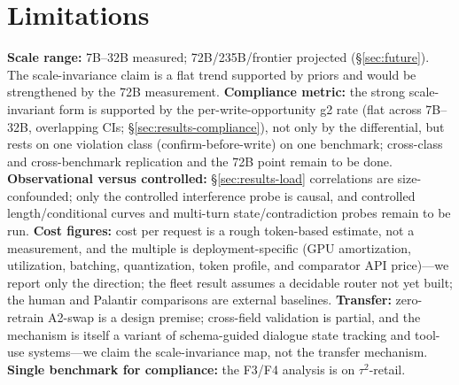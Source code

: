 \section{Limitations}\label{sec:limits}
\textbf{Scale range:} 7B--32B measured; 72B/235B/frontier projected (\S\ref{sec:future}). The scale-invariance claim is a flat trend supported by priors and would be strengthened by the 72B measurement. \textbf{Compliance metric:} the strong scale-invariant form is supported by the per-write-opportunity g2 rate (flat across 7B--32B, overlapping CIs; \S\ref{sec:results-compliance}), not only by the differential, but rests on one violation class (confirm-before-write) on one benchmark; cross-class and cross-benchmark replication and the 72B point remain to be done. \textbf{Observational versus controlled:} \S\ref{sec:results-load} correlations are size-confounded; only the controlled interference probe is causal, and controlled length/conditional curves and multi-turn state/contradiction probes remain to be run. \textbf{Cost figures:} cost per request is a rough token-based estimate, not a measurement, and the multiple is deployment-specific (GPU amortization, utilization, batching, quantization, token profile, and comparator API price)---we report only the direction; the fleet result assumes a decidable router not yet built; the human and Palantir comparisons are external baselines. \textbf{Transfer:} zero-retrain A2-swap is a design premise; cross-field validation is partial, and the mechanism is itself a variant of schema-guided dialogue state tracking and tool-use systems---we claim the scale-invariance map, not the transfer mechanism. \textbf{Single benchmark for compliance:} the F3/F4 analysis is on $\tau^2$-retail.
